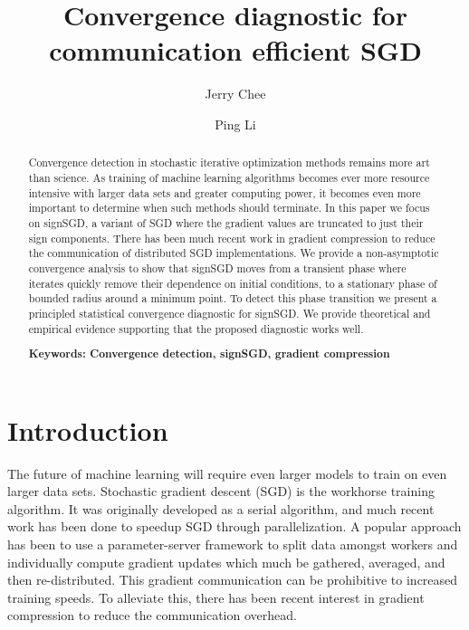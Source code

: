 \documentclass[12pt]{article}
\title{
Convergence diagnostic for communication efficient SGD
}
\author{Jerry Chee}
\author{Ping Li}
\affil[]{Cognitive Computing Lab, Baidu USA}
\begin{document}
\pagestyle{empty}
\maketitle

\begin{abstract} 
Convergence detection in stochastic iterative optimization methods remains more art than science.
As training of machine learning algorithms becomes ever more resource intensive with larger data sets and greater computing power, it becomes even more important to determine when such methods should terminate.
In this paper we focus on signSGD, a variant of SGD where the gradient values are truncated to just their sign components.
There has been much recent work in gradient compression to reduce the communication of distributed SGD implementations.
We provide a non-asymptotic convergence analysis to show that signSGD moves from a transient phase where iterates quickly remove their dependence on initial conditions, to a stationary phase of bounded radius around a minimum point.
To detect this phase transition we present a principled statistical convergence diagnostic for signSGD. 
We provide theoretical and empirical evidence supporting that the proposed diagnostic works well. 

\vfill
\textbf{Keywords: Convergence detection, signSGD, gradient compression
} 
\end{abstract}
\if


\pagestyle{plain}
\setcounter{page}{1}

\section{Introduction}
The future of machine learning will require even larger models to train on even larger data sets. 
Stochastic gradient descent (SGD) is the workhorse training algorithm.
It was originally developed as a serial algorithm, and much recent work has been done to speedup SGD through parallelization.
A popular approach has been to use a parameter-server framework to split data amongst workers and individually compute gradient updates which much be gathered, averaged, and then re-distributed. 
This gradient communication can be prohibitive to increased training speeds.
To alleviate this, there has been recent interest in gradient compression to reduce the communication overhead. 
\end{document}
